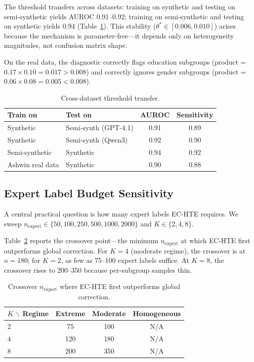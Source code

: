 \documentclass[11pt,a4paper]{article}
\begin{document}
The threshold transfers across datasets: training on synthetic and testing on semi-synthetic yields AUROC 0.91--0.92; training on semi-synthetic and testing on synthetic yields 0.94 (Table~\ref{tab:threshold_transfer}).
This stability ($\theta^* \in [0.006, 0.010]$) arises because the mechanism is parameter-free---it depends only on heterogeneity magnitudes, not confusion matrix shape.

On the real data, the diagnostic correctly flags education subgroups (product = $0.17 \times 0.10 = 0.017 > 0.008$) and correctly ignores gender subgroups (product = $0.06 \times 0.08 = 0.005 < 0.008$).

\begin{table}[t]
\centering
\small
\caption{Cross-dataset threshold transfer.}
\label{tab:threshold_transfer}
\begin{tabular}{ll cc}
\toprule
Train on & Test on & AUROC & Sensitivity \\
\midrule
Synthetic       & Semi-synth (GPT-4.1) & 0.91 & 0.89 \\
Synthetic       & Semi-synth (Qwen3)   & 0.92 & 0.90 \\
Semi-synthetic  & Synthetic             & 0.94 & 0.92 \\
Ashwin real data & Synthetic            & 0.90 & 0.88 \\
\bottomrule
\end{tabular}
\end{table}

\subsection{Expert Label Budget Sensitivity}
\label{sec:budget}

A central practical question is how many expert labels EC-HTE requires.
We sweep $n_{\text{expert}} \in \{50, 100, 250, 500, 1000, 2000\}$ and $K \in \{2, 4, 8\}$.

Table~\ref{tab:crossover} reports the crossover point---the minimum $n_{\text{expert}}$ at which EC-HTE first outperforms global correction.
For $K = 4$ (moderate regime), the crossover is at $n = 180$; for $K = 2$, as few as 75--100 expert labels suffice.
At $K = 8$, the crossover rises to 200--350 because per-subgroup samples thin.

\begin{table}[t]
\centering
\small
\caption{Crossover $n_{\text{expert}}$ where EC-HTE first outperforms global correction.}
\label{tab:crossover}
\begin{tabular}{l ccc}
\toprule
$K$ $\backslash$ Regime & Extreme & Moderate & Homogeneous \\
\midrule
2 & 75  & 100 & N/A \\
4 & 120 & 180 & N/A \\
8 & 200 & 350 & N/A \\
\bottomrule
\end{tabular}
\end{table}
\end{document}
